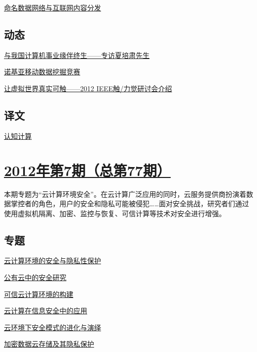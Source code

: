 \documentclass[a4paper]{article}
\begin{document}
\href{http://history.ccf.org.cn/resources/1190201776262/2012/08/15/12.pdf}{命名数据网络与互联网内容分发}

\subsection{动态}
\href{http://history.ccf.org.cn/resources/1190201776262/2012/08/15/14.pdf}{与我国计算机事业缘伴终生——专访夏培肃先生}

\href{http://history.ccf.org.cn/resources/1190201776262/2012/08/17/15.pdf}{诺基亚移动数据挖掘竞赛}

\href{http://history.ccf.org.cn/resources/1190201776262/2012/08/15/16.pdf}{让虚拟世界真实可触——2012 IEEE触/力觉研讨会介绍}

\subsection{译文}
\href{http://history.ccf.org.cn/resources/1190201776262/2012/08/15/17.pdf}{认知计算}


\section{\href{http://history.ccf.org.cn/sites/ccf/jsjtbbd.jsp?contentId=2684767749074}{\textbf{2012年第7期（总第77期）}}}
本期专题为“云计算环境安全”。在云计算广泛应用的同时，云服务提供商扮演着数据掌控者的角色，用户的安全和隐私可能被侵犯……面对安全挑战，研究者们通过使用虚拟机隔离、加密、监控与恢复、可信计算等技术对安全进行增强。
\subsection{专题}
\href{http://history.ccf.org.cn/resources/1190201776262/2012/07/16/1.pdf}{云计算环境的安全与隐私性保护}

\href{http://history.ccf.org.cn/resources/1190201776262/2012/07/16/3.pdf}{公有云中的安全研究}

\href{http://history.ccf.org.cn/resources/1190201776262/2012/07/16/5.pdf}{可信云计算环境的构建}

\href{http://history.ccf.org.cn/resources/1190201776262/2012/07/16/6.pdf}{云计算在信息安全中的应用}

\href{http://history.ccf.org.cn/resources/1190201776262/2012/07/16/7.pdf}{云环境下安全模式的进化与演绎}

\href{http://history.ccf.org.cn/resources/1190201776262/2012/07/16/4.pdf}{加密数据云存储及其隐私保护}
\end{document}
